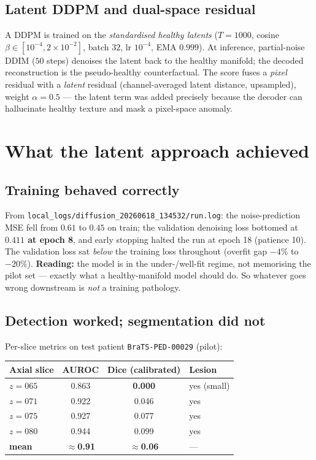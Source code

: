 \documentclass[11pt,a4paper]{article}
\newcommand{\code}[1]{\texttt{\small #1}}
\begin{document}
\subsection{Latent DDPM and dual-space residual}
A DDPM is trained on the \emph{standardised healthy latents} ($T=1000$, cosine
$\beta\in[10^{-4},2\times10^{-2}]$, batch $32$, lr $10^{-4}$, EMA $0.999$). At
inference, partial-noise DDIM ($50$ steps) denoises the latent back to the
healthy manifold; the decoded reconstruction is the pseudo-healthy
counterfactual. The score fuses a \emph{pixel} residual with a \emph{latent}
residual (channel-averaged latent distance, upsampled), weight $\alpha=0.5$ ---
the latent term was added precisely because the decoder can hallucinate healthy
texture and mask a pixel-space anomaly.

\section{What the latent approach achieved}

\subsection{Training behaved correctly}
From \code{local\_logs/diffusion\_20260618\_134532/run.log}: the noise-prediction
MSE fell from $0.61$ to $0.45$ on train; the validation denoising loss bottomed
at \textbf{$0.411$ at epoch 8}, and early stopping halted the run at epoch 18
(patience 10). The validation loss sat \emph{below} the training loss throughout
(overfit gap $-4\%$ to $-20\%$). \textbf{Reading:} the model is in the
under-/well-fit regime, not memorising the pilot set --- exactly what a
healthy-manifold model should do. So whatever goes wrong downstream is
\emph{not} a training pathology.

\subsection{Detection worked; segmentation did not}
Per-slice metrics on test patient \code{BraTS-PED-00029} (pilot):

\begin{longtable}{@{}lccl@{}}
\toprule
Axial slice & AUROC & Dice (calibrated) & Lesion \\
\midrule
\endhead
$z=065$ & 0.863 & \textbf{0.000} & yes (small) \\
$z=071$ & 0.922 & 0.046 & yes \\
$z=075$ & 0.927 & 0.077 & yes \\
$z=080$ & 0.944 & 0.099 & yes \\
\midrule
\textbf{mean} & \textbf{$\approx$0.91} & \textbf{$\approx$0.06} & --- \\
\bottomrule
\end{longtable}
\end{document}
